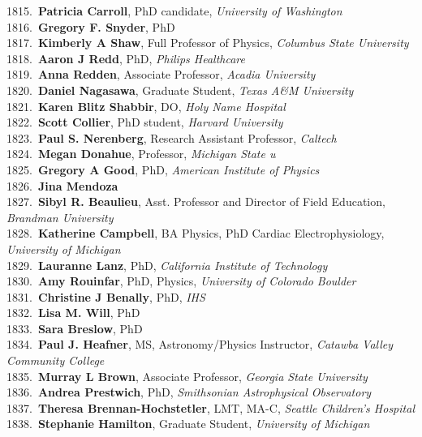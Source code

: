 1815.~{\bf Patricia Carroll}, PhD candidate, {\sl University of Washington} \\
1816.~{\bf Gregory F. Snyder}, PhD \\
1817.~{\bf Kimberly A Shaw}, Full Professor of Physics, {\sl Columbus State University} \\
1818.~{\bf Aaron J Redd}, PhD, {\sl Philips Healthcare} \\
1819.~{\bf Anna Redden}, Associate Professor, {\sl Acadia University} \\
1820.~{\bf Daniel Nagasawa}, Graduate Student, {\sl Texas A\&M University} \\
1821.~{\bf Karen Blitz Shabbir}, DO, {\sl Holy Name Hospital } \\
1822.~{\bf Scott Collier}, PhD student, {\sl Harvard University} \\
1823.~{\bf Paul S. Nerenberg}, Research Assistant Professor, {\sl Caltech} \\
1824.~{\bf Megan Donahue}, Professor, {\sl Michigan State u} \\
1825.~{\bf Gregory A Good}, PhD, {\sl American Institute of Physics} \\
1826.~{\bf Jina Mendoza} \\
1827.~{\bf Sibyl R. Beaulieu}, Asst. Professor and Director of Field Education, {\sl Brandman University} \\
1828.~{\bf Katherine Campbell}, BA Physics, PhD Cardiac Electrophysiology, {\sl University of Michigan} \\
1829.~{\bf Lauranne Lanz}, PhD, {\sl California Institute of Technology} \\
1830.~{\bf Amy Rouinfar}, PhD, Physics, {\sl University of Colorado Boulder} \\
1831.~{\bf Christine J Benally}, PhD, {\sl IHS} \\
1832.~{\bf Lisa M. Will}, PhD \\
1833.~{\bf Sara Breslow}, PhD \\
1834.~{\bf Paul J. Heafner}, MS, Astronomy/Physics Instructor, {\sl Catawba Valley Community College} \\
1835.~{\bf Murray L Brown}, Associate Professor, {\sl Georgia State University} \\
1836.~{\bf Andrea Prestwich}, PhD, {\sl Smithsonian Astrophysical  Observatory} \\
1837.~{\bf Theresa Brennan-Hochstetler}, LMT, MA-C, {\sl Seattle Children's Hospital} \\
1838.~{\bf Stephanie Hamilton}, Graduate Student, {\sl University of Michigan} \\
